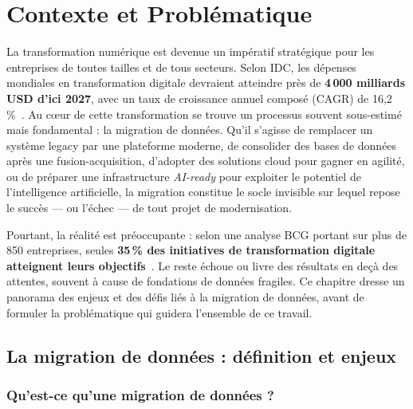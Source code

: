 
\chapter{Contexte et Problématique}

La transformation numérique est devenue un impératif stratégique pour les
entreprises de toutes tailles et de tous secteurs. Selon IDC, les dépenses
mondiales en transformation digitale devraient atteindre près de
\textbf{4\,000 milliards USD d'ici 2027}, avec un taux de croissance annuel
composé (CAGR) de 16,2\,\%~\cite{integrate_io_stats}. Au cœur de cette
transformation se trouve un processus souvent sous-estimé mais fondamental :
la migration de données. Qu'il s'agisse de remplacer un système legacy par
une plateforme moderne, de consolider des bases de données après une
fusion-acquisition, d'adopter des solutions cloud pour gagner en agilité, ou
de préparer une infrastructure \textit{AI-ready} pour exploiter le potentiel
de l'intelligence artificielle, la migration constitue le socle invisible sur
lequel repose le succès --- ou l'échec --- de tout projet de modernisation.

Pourtant, la réalité est préoccupante : selon une analyse BCG portant sur
plus de 850 entreprises, seules \textbf{35\,\% des initiatives de
transformation digitale atteignent leurs objectifs}~\cite{integrate_io_stats}.
Le reste échoue ou livre des résultats en deçà des attentes, souvent à cause
de fondations de données fragiles. Ce chapitre dresse un panorama des enjeux
et des défis liés à la migration de données, avant de formuler la
problématique qui guidera l'ensemble de ce travail.

\section{La migration de données : définition et enjeux}

\subsection{Qu'est-ce qu'une migration de données ?}


